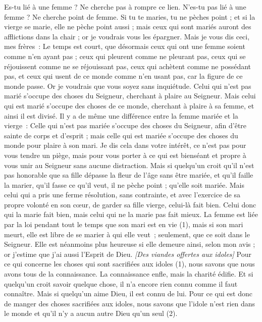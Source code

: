 \begin{multicols}{2}
Es-tu lié à une femme ? Ne cherche pas à rompre ce lien. N’es-tu pas lié à une femme ? Ne cherche point de femme.
Si tu te maries, tu ne pèches point ; et si la vierge se marie, elle ne pèche point aussi ; mais ceux qui sont mariés auront des afflictions dans la chair ; or je voudrais vous les épargner.
Mais je vous dis ceci, mes frères : Le temps est court, que désormais ceux qui ont une femme soient comme n’en ayant pas ;
ceux qui pleurent comme ne pleurant pas, ceux qui se réjouissent comme ne se réjouissant pas, ceux qui achètent comme ne possédant pas,
et ceux qui usent de ce monde comme n'en usant pas, car la figure de ce monde passe.
Or je voudrais que vous soyez sans inquiétude. Celui qui n'est pas marié s’occupe des choses du Seigneur, cherchant à plaire au Seigneur.
Mais celui qui est marié s’occupe des choses de ce monde, cherchant à plaire à sa femme, et ainsi il est divisé.
Il y a de même une différence entre la femme mariée et la vierge : Celle qui n’est pas mariée s’occupe des choses du Seigneur, afin d’être sainte de corps et d'esprit ; mais celle qui est mariée s’occupe des choses du monde pour plaire à son mari.
Je dis cela dans votre intérêt, ce n’est pas pour vous tendre un piège, mais pour vous porter à ce qui est bienséant et propre à vous unir au Seigneur sans aucune distraction.
Mais si quelqu'un croit qu’il n’est pas honorable que sa fille dépasse la fleur de l’âge sans être mariée, et qu’il faille la marier, qu'il fasse ce qu'il veut, il ne pèche point ; qu'elle soit mariée.
Mais celui qui a pris une ferme résolution, sans contrainte, et avec l’exercice de sa propre volonté en son cœur, de garder sa fille vierge, celui-là fait bien.
Celui donc qui la marie fait bien, mais celui qui ne la marie pas fait mieux.
La femme est liée par la loi pendant tout le temps que son mari est en vie (1), mais si son mari meurt, elle est libre de se marier à qui elle veut ; seulement, que ce soit dans le Seigneur.
Elle est néanmoins plus heureuse si elle demeure ainsi, selon mon avis ; or j'estime que j'ai aussi l'Esprit de Dieu.
\textit{[Des viandes offertes aux idoles]}
\VerseOne{}Pour ce qui concerne les choses qui sont sacrifiées aux idoles (1), nous savons que nous avons tous de la connaissance. La connaissance enfle, mais la charité édifie.
Et si quelqu'un croit savoir quelque chose, il n'a encore rien connu comme il faut connaître.
Mais si quelqu'un aime Dieu, il est connu de lui.
Pour ce qui est donc de manger des choses sacrifiées aux idoles, nous savons que l'idole n'est rien dans le monde et qu'il n'y a aucun autre Dieu qu’un seul (2).

\end{multicols}
